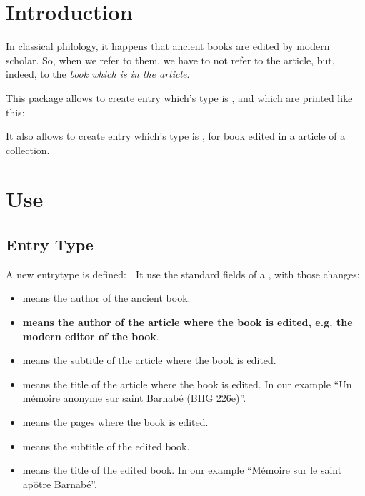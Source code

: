 \documentclass{ltxdockit}[2011/03/25]
\begin{document}
\printtitlepage
\tableofcontents

\section{Introduction}

In classical philology, it happens that ancient books are edited by modern scholar. So, when we refer to them, we have to not refer to the article, but, indeed, to the \emph{book which is in the article}.

This package allows to create entry which's type is , and which are printed like this:

\begin{quotation}
\cite{BHG226e}
\end{quotation}

It also allows to create entry which's type is , for book edited in a article of a collection. 

\begin{quotation}
  \cite{AcTiteLatin}
\end{quotation}

\section{Use}

\subsection{ Entry Type}

A new entrytype is defined: . It use the standard fields of a , with those changes:

\begin{itemize}
	\item {} means the author of the ancient book.
	\item \textbf{ means the author of the article where the book is edited, e.g. the modern editor of the book}.
	\item {} means the subtitle of the article where the book is edited.
	\item {} means the title of the article where the book is edited. In our example \enquote{Un mémoire anonyme sur saint Barnabé (BHG 226e)}.
	\item {} means the pages where the book is edited.
	\item {} means the subtitle of the edited book.
	\item {} means the title of the edited book. In our example \enquote{Mémoire sur le saint apôtre Barnabé}.


\end{itemize}
\end{document}

